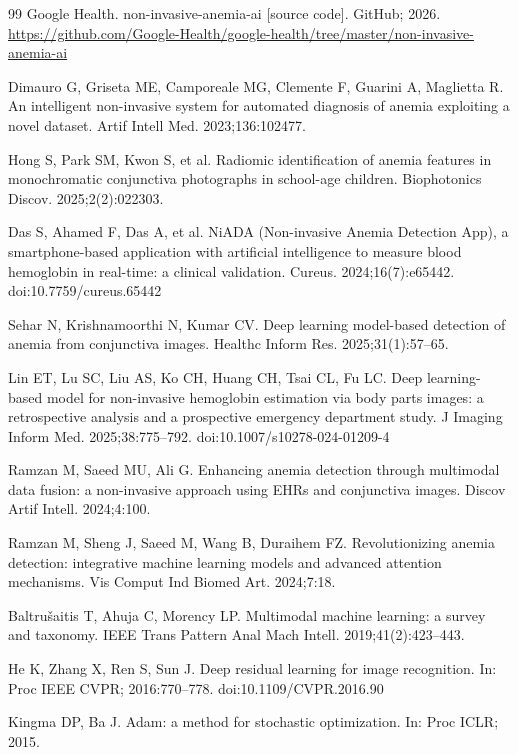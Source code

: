 \documentclass[10pt,a4paper,twocolumn]{article}
\begin{document}
\begin{thebibliography}{99}
 Google Health. non-invasive-anemia-ai [source code]. GitHub; 2026. \url{https://github.com/Google-Health/google-health/tree/master/non-invasive-anemia-ai}

 Dimauro G, Griseta ME, Camporeale MG, Clemente F, Guarini A, Maglietta R. An intelligent non-invasive system for automated diagnosis of anemia exploiting a novel dataset. Artif Intell Med. 2023;136:102477.

 Hong S, Park SM, Kwon S, et al. Radiomic identification of anemia features in monochromatic conjunctiva photographs in school-age children. Biophotonics Discov. 2025;2(2):022303.

 Das S, Ahamed F, Das A, et al. NiADA (Non-invasive Anemia Detection App), a smartphone-based application with artificial intelligence to measure blood hemoglobin in real-time: a clinical validation. Cureus. 2024;16(7):e65442. doi:10.7759/cureus.65442

 Sehar N, Krishnamoorthi N, Kumar CV. Deep learning model-based detection of anemia from conjunctiva images. Healthc Inform Res. 2025;31(1):57--65.

 Lin ET, Lu SC, Liu AS, Ko CH, Huang CH, Tsai CL, Fu LC. Deep learning-based model for non-invasive hemoglobin estimation via body parts images: a retrospective analysis and a prospective emergency department study. J Imaging Inform Med. 2025;38:775--792. doi:10.1007/s10278-024-01209-4

 Ramzan M, Saeed MU, Ali G. Enhancing anemia detection through multimodal data fusion: a non-invasive approach using EHRs and conjunctiva images. Discov Artif Intell. 2024;4:100.

 Ramzan M, Sheng J, Saeed M, Wang B, Duraihem FZ. Revolutionizing anemia detection: integrative machine learning models and advanced attention mechanisms. Vis Comput Ind Biomed Art. 2024;7:18.

 Baltru\v{s}aitis T, Ahuja C, Morency LP. Multimodal machine learning: a survey and taxonomy. IEEE Trans Pattern Anal Mach Intell. 2019;41(2):423--443.

 He K, Zhang X, Ren S, Sun J. Deep residual learning for image recognition. In: Proc IEEE CVPR; 2016:770--778. doi:10.1109/CVPR.2016.90

 Kingma DP, Ba J. Adam: a method for stochastic optimization. In: Proc ICLR; 2015.


\end{thebibliography}
\end{document}
